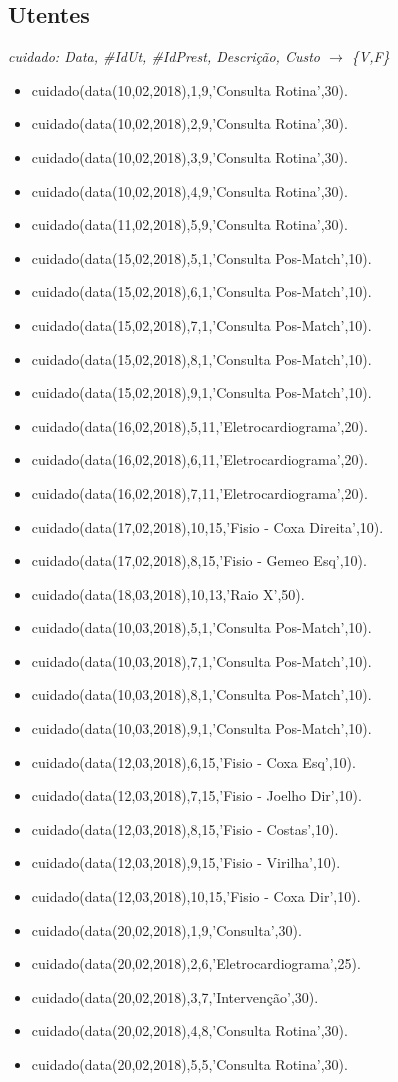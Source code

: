 \documentclass[a4paper]{report} %
\begin{document}
\subsection{Utentes}
\textit{cuidado: Data, \#IdUt, \#IdPrest, Descrição, Custo $\rightarrow$ \{V,F\}}
\begin{itemize}
\item cuidado(data(10,02,2018),1,9,'Consulta Rotina',30).
\item cuidado(data(10,02,2018),2,9,'Consulta Rotina',30).
\item cuidado(data(10,02,2018),3,9,'Consulta Rotina',30).
\item cuidado(data(10,02,2018),4,9,'Consulta Rotina',30).
\item cuidado(data(11,02,2018),5,9,'Consulta Rotina',30).
\item cuidado(data(15,02,2018),5,1,'Consulta Pos-Match',10).
\item cuidado(data(15,02,2018),6,1,'Consulta Pos-Match',10).
\item cuidado(data(15,02,2018),7,1,'Consulta Pos-Match',10).
\item cuidado(data(15,02,2018),8,1,'Consulta Pos-Match',10).
\item cuidado(data(15,02,2018),9,1,'Consulta Pos-Match',10).
\item cuidado(data(16,02,2018),5,11,'Eletrocardiograma',20).
\item cuidado(data(16,02,2018),6,11,'Eletrocardiograma',20).
\item cuidado(data(16,02,2018),7,11,'Eletrocardiograma',20).
\item cuidado(data(17,02,2018),10,15,'Fisio - Coxa Direita',10).
\item cuidado(data(17,02,2018),8,15,'Fisio - Gemeo Esq',10).
\item cuidado(data(18,03,2018),10,13,'Raio X',50).
\item cuidado(data(10,03,2018),5,1,'Consulta Pos-Match',10).
\item cuidado(data(10,03,2018),7,1,'Consulta Pos-Match',10).
\item cuidado(data(10,03,2018),8,1,'Consulta Pos-Match',10).
\item cuidado(data(10,03,2018),9,1,'Consulta Pos-Match',10).
\item cuidado(data(12,03,2018),6,15,'Fisio - Coxa Esq',10).
\item cuidado(data(12,03,2018),7,15,'Fisio - Joelho Dir',10).
\item cuidado(data(12,03,2018),8,15,'Fisio - Costas',10).
\item cuidado(data(12,03,2018),9,15,'Fisio - Virilha',10).
\item cuidado(data(12,03,2018),10,15,'Fisio - Coxa Dir',10).
\item cuidado(data(20,02,2018),1,9,'Consulta',30).
\item cuidado(data(20,02,2018),2,6,'Eletrocardiograma',25).
\item cuidado(data(20,02,2018),3,7,'Intervenção',30).
\item cuidado(data(20,02,2018),4,8,'Consulta Rotina',30).
\item cuidado(data(20,02,2018),5,5,'Consulta Rotina',30).
\end{itemize}
\end{document}
